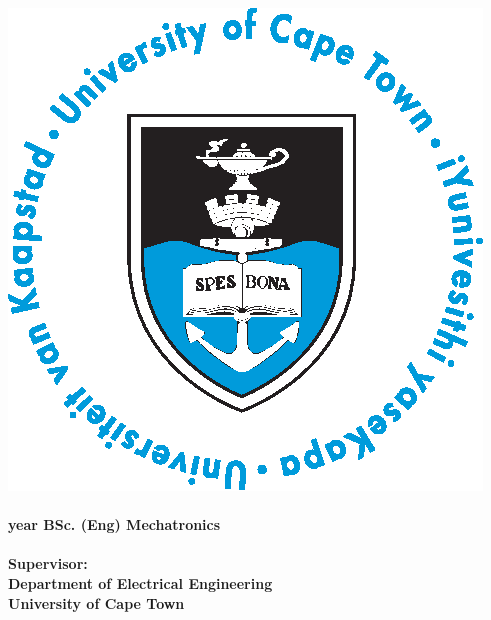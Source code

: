 \begin{minipage}{1\textwidth}
\begin{center}
\Huge\textbf{\thetitle}
\vskip20pt
\vskip50pt
\includegraphics[width=0.45\linewidth]{UCTcircular}
\vskip50pt
\vskip20pt
\Large{\textbf{\theauthor\\
\Large\studentnum\\
 year BSc. (Eng) Mechatronics\\
\vskip70pt
\coursecode \\
Supervisor: \staffmember \\
Department of Electrical Engineering\\
University of Cape Town \\
\vskip20pt
\thedate}}\\
\end{center}
\end{minipage}
\newpage 
